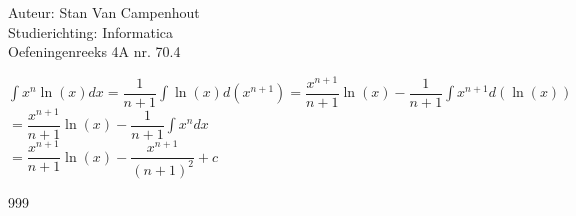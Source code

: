 \documentclass[a4paper]{article}
\begin{document}
  
\noindent \large Auteur: Stan Van Campenhout \\
\noindent \large Studierichting:  Informatica\\
\noindent \large Oefeningenreeks 4A nr. 70.4\\

\medskip

\normalsize

$ \displaystyle\int x^n\ln\left(x\right)dx = \dfrac{1}{n+1}\displaystyle\int\ln\left(x\right)d\left(x^{n+1}\right)
= \dfrac{x^{n+1}}{n+1}\ln\left(x\right)-\dfrac{1}{n+1}\displaystyle\int x^{n+1}d\left(\ln\left(x\right)\right) $\\

$ = \dfrac{x^{n+1}}{n+1}\ln\left(x\right)-\dfrac{1}{n+1}\displaystyle\int x^ndx $\\

$ = \dfrac{x^{n+1}}{n+1}\ln\left(x\right) - \dfrac{x^{n+1}}{\left(n+1\right)^2} + c $\\

\begin{thebibliography}{999}
\end{thebibliography}
\end{document}
